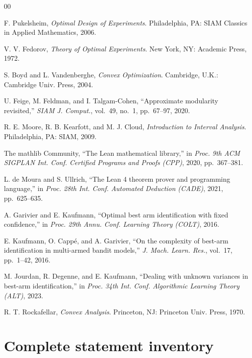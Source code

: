 \documentclass[conference]{IEEEtran}
\theoremstyle{definition}
\begin{document}
\begin{thebibliography}{00}

 F. Pukelsheim, \emph{Optimal Design of Experiments}. Philadelphia,
PA: SIAM Classics in Applied Mathematics, 2006.

 V. V. Fedorov, \emph{Theory of Optimal Experiments}. New York, NY:
Academic Press, 1972.

 S. Boyd and L. Vandenberghe, \emph{Convex Optimization}. Cambridge,
U.K.: Cambridge Univ. Press, 2004.

 U. Feige, M. Feldman, and I. Talgam-Cohen, ``Approximate modularity
revisited,'' \emph{SIAM J. Comput.}, vol.~49, no.~1, pp.~67--97, 2020.

 R. E. Moore, R. B. Kearfott, and M. J. Cloud, \emph{Introduction to
Interval Analysis}. Philadelphia, PA: SIAM, 2009.

 The mathlib Community, ``The Lean mathematical library,'' in
\emph{Proc. 9th ACM SIGPLAN Int. Conf. Certified Programs and Proofs (CPP)}, 2020,
pp.~367--381.

 L. de Moura and S. Ullrich, ``The Lean 4 theorem prover and
programming language,'' in \emph{Proc. 28th Int. Conf. Automated Deduction (CADE)}, 2021,
pp.~625--635.

 A. Garivier and E. Kaufmann, ``Optimal best arm identification with
fixed confidence,'' in \emph{Proc. 29th Annu. Conf. Learning Theory (COLT)}, 2016.

 E. Kaufmann, O. Capp\'e, and A. Garivier, ``On the complexity of
best-arm identification in multi-armed bandit models,'' \emph{J. Mach. Learn. Res.},
vol.~17, pp.~1--42, 2016.

 M. Jourdan, R. Degenne, and E. Kaufmann, ``Dealing with unknown
variances in best-arm identification,'' in \emph{Proc. 34th Int. Conf. Algorithmic Learning
Theory (ALT)}, 2023.

 R. T. Rockafellar, \emph{Convex Analysis}. Princeton, NJ:
Princeton Univ. Press, 1970.

\end{thebibliography}

\appendices
\section{Complete statement inventory}
\label{app:d6-inventory}
\end{document}
